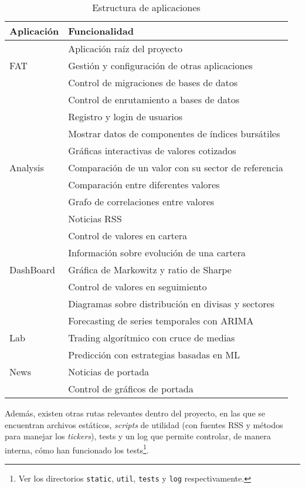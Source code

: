 \begin{table}[H]
\centering
\begin{tabular}{p{3cm} p{10cm}}
\toprule
\textbf{Aplicación} & \textbf{Funcionalidad} \\
\midrule
	& Aplicación raíz del proyecto \\
FAT & Gestión y configuración de otras aplicaciones \\
    & Control de migraciones de bases de datos \\
    & Control de enrutamiento a bases de datos \\
\midrule
		 & Registro y login de usuarios \\
         & Mostrar datos de componentes de índices bursátiles \\
         & Gráficas interactivas de valores cotizados \\
Analysis & Comparación de un valor con su sector de referencia \\
         & Comparación entre diferentes valores \\
         & Grafo de correlaciones entre valores \\
         & Noticias RSS \\
\midrule
		  & Control de valores en cartera \\
          & Información sobre evolución de una cartera \\
DashBoard & Gráfica de Markowitz y ratio de Sharpe \\
          & Control de valores en seguimiento \\
          & Diagramas sobre distribución en divisas y sectores \\
\midrule
    & Forecasting de series temporales con ARIMA \\
Lab & Trading algorítmico con cruce de medias \\
    & Predicción con estrategias basadas en ML \\
\midrule
News & Noticias de portada \\
     & Control de gráficos de portada \\
\bottomrule
\end{tabular}
\caption{Estructura de aplicaciones}
\label{apps}
\end{table}

Además, existen otras rutas relevantes dentro del proyecto, en las que se encuentran archivos estáticos, \emph{scripts} de utilidad (con fuentes RSS y métodos para manejar los \emph{tickers}), tests y un log que permite controlar, de manera interna, cómo han funcionado los tests\footnote{Ver los directorios \texttt{static}, \texttt{util}, \texttt{tests} y \texttt{log} respectivamente.}. 

